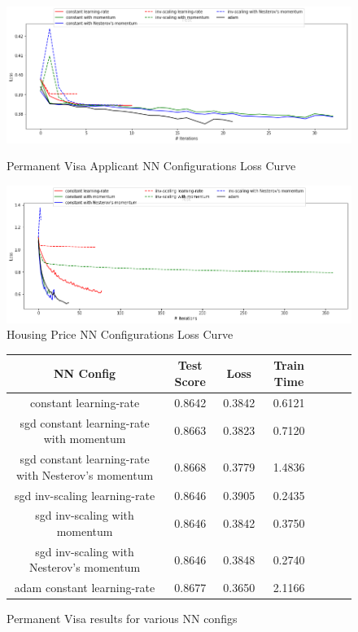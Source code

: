 \documentclass[h]{article}
\begin{document}
\begin{figure}[H]
      \includegraphics[width=1\textwidth,keepaspectratio]{1_nn_together.png} 
      \caption*{Permanent Visa Applicant NN Configurations Loss Curve} 
   \endminipage\hfill
      \includegraphics[width=1\textwidth,keepaspectratio]{2_nn_together.png} 
      \caption*{Housing Price NN Configurations Loss Curve} 
   \endminipage\hfill
\end{figure}

\begin{figure}[H]
\begin{tabular}{ | c | c  | c | c | c | c | c |} 
\hline
\textbf{NN Config} & \textbf{Test Score} & \textbf{Loss} & \textbf{Train Time}   \\ 
\hline
constant learning-rate & 0.8642 & 0.3842 & 0.6121 \\ \hline
sgd constant  learning-rate with momentum & 0.8663 & 0.3823 & 0.7120 \\ \hline
sgd constant  learning-rate with Nesterov's momentum & 0.8668 & 0.3779 & 1.4836 \\ \hline
sgd inv-scaling learning-rate & 0.8646 & 0.3905 & 0.2435 \\ \hline
sgd inv-scaling with momentum & 0.8646 & 0.3842 & 0.3750 \\ \hline
sgd inv-scaling with Nesterov's momentum & 0.8646 & 0.3848 & 0.2740 \\ \hline
adam constant  learning-rate & 0.8677 & 0.3650 & 2.1166 \\ \hline
\end{tabular}
\caption*{Permanent Visa results for various NN configs}
\endminipage\hfill
\end{figure}
\end{document}
